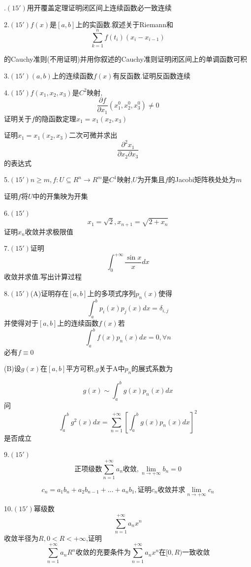 \documentclass[b5paper]{ctexart}
\begin{document}
\pagestyle{plain}
.$(15')$用开覆盖定理证明闭区间上连续函数必一致连续

2.$(15')$$f(x)$是$[a,b]$上的实函数.叙述关于Riemann和
\[\sum_{k=1}^n f(t_i)(x_i-x_{i-1})\]

的Cauchy准则(不用证明)并用你叙述的Cauchy准则证明闭区间上的单调函数可积

3.$(15')$$(a,b)$上的连续函数$f(x)$有反函数.证明反函数连续

4.$(15')$$f(x_1,x_2,x_3)$是$C^2$映射,
\[\frac{\partial f}{\partial x_1}(x_1^0,x_2^0,x_3^0)\not =0\]
证明关于$f$的隐函数定理$x_1=x_1(x_2,x_3)$

证明$x_1=x_1(x_2,x_3)$二次可微并求出
\[\frac{\partial^2 x_1}{\partial x_2\partial x_3}\]的表达式

5.$(15')$$n\ge m, f:U\subseteq R^n\rightarrow R^m$是$C^1$映射,$U$为开集且$f$的Jacobi矩阵秩处处为$m$

证明$f$将$U$中的开集映为开集

6.$(15')$\[x_1=\sqrt{2},x_{n+1}=\sqrt{2+x_n}\]证明$x_n$收敛并求极限值

7.$(15')$证明
\[\int_0^{+\infty}\frac{\sin x}{x}dx\]收敛并求值.写出计算过程

8.$(15')$(A)证明存在$[a,b]$上的多项式序列$p_n(x)$使得
\[\int_a^b p_i(x)p_j(x)dx=\delta_{i,j}\]
并使得对于$[a,b]$上的连续函数$f(x)$若
\[\int_a^b f(x)p_n(x)dx=0,\forall n\]必有$f\equiv 0$

(B)设$g(x)$在$[a,b]$平方可积,$g$关于A中$p_n$的展式系数为

\[g(x)\sim\int_a^b g(x)p_n(x)dx\]
问
\[\int_a^b g^2(x)dx=\sum_{n=1}^{+\infty}\left[\int_a^b g(x)p_n(x)dx\right]^2\]是否成立

9.$(15')$\[\mbox{正项级数}\sum_{n=1}^{+\infty} a_n\mbox{收敛},\lim_{n\to +\infty}b_n=0\]

\[c_n=a_1b_n+a_2b_{n-1}+\dots +a_nb_1,\mbox{证明}c_n\mbox{收敛并求}\lim_{n\to +\infty}c_n\]

10.$(15')$幂级数\[\sum_{n=1}^{+\infty} a_nx^n\]
收敛半径为$R,0<R<+\infty$,证明\[\sum_{n=1}^{+\infty} a_nR^n\mbox{收敛的充要条件为}\sum_{n=1}^{+\infty} a_nx^n\mbox{在}[0,R)\mbox{一致收敛}\]
\end{document}
